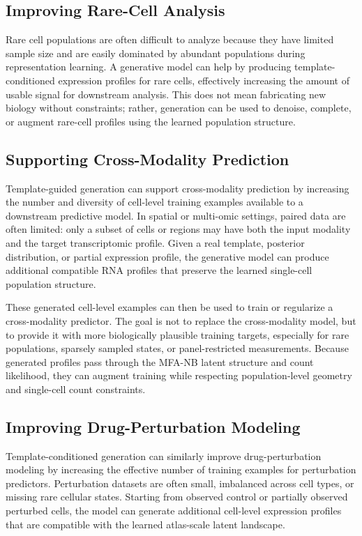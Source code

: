 \documentclass[11pt]{article}
\begin{document}
\subsection{Improving Rare-Cell Analysis}

Rare cell populations are often difficult to analyze because they have limited sample size and are easily dominated by abundant populations during representation learning. A generative model can help by producing template-conditioned expression profiles for rare cells, effectively increasing the amount of usable signal for downstream analysis. This does not mean fabricating new biology without constraints; rather, generation can be used to denoise, complete, or augment rare-cell profiles using the learned population structure.


\subsection{Supporting Cross-Modality Prediction}

Template-guided generation can support cross-modality prediction by increasing the number and diversity of cell-level training examples available to a downstream predictive model. In spatial or multi-omic settings, paired data are often limited: only a subset of cells or regions may have both the input modality and the target transcriptomic profile. Given a real template, posterior distribution, or partial expression profile, the generative model can produce additional compatible RNA profiles that preserve the learned single-cell population structure.

These generated cell-level examples can then be used to train or regularize a cross-modality predictor. The goal is not to replace the cross-modality model, but to provide it with more biologically plausible training targets, especially for rare populations, sparsely sampled states, or panel-restricted measurements. Because generated profiles pass through the MFA-NB latent structure and count likelihood, they can augment training while respecting population-level geometry and single-cell count constraints.

\subsection{Improving Drug-Perturbation Modeling}

Template-conditioned generation can similarly improve drug-perturbation modeling by increasing the effective number of training examples for perturbation predictors. Perturbation datasets are often small, imbalanced across cell types, or missing rare cellular states. Starting from observed control or partially observed perturbed cells, the model can generate additional cell-level expression profiles that are compatible with the learned atlas-scale latent landscape.
\end{document}
